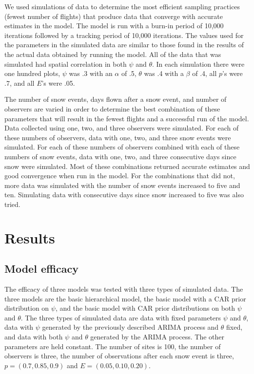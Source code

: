 \documentclass[11pt]{article}
\begin{document}
    We used simulations of data to determine the most efficient sampling
    practices (fewest number of flights) that produce data that converge with
    accurate estimates in the model.  The model is run with a burn-in period of
    10,000 iterations followed by a tracking period of 10,000 iterations.  The
    values used for the parameters in the simulated data are similar to those
    found in the results of the actual data obtained by running the model.  All
    of the data that was simulated had spatial correlation in both \(\psi\) and
    \(\theta\).  In each simulation there were one hundred plots, \(\psi\) was
    .3 with an \(\alpha\) of .5, \(\theta\) was .4 with a \(\beta\) of .4, all
    \(p\)'s were .7, and all \(E\)'s were .05.

    The number of snow events, days flown after a snow event, and number of
    observers are varied in order to determine the best combination of these
    parameters that will result in the fewest flights and a successful run of
    the model.  Data collected using one, two, and three observers were
    simulated.  For each of these numbers of observers, data with one, two, and
    three snow events were simulated.  For each of these numbers of observers
    combined with each of these numbers of snow events, data with one, two, and
    three consecutive days since snow were simulated.  Most of these
    combinations returned accurate estimates and good convergence when run in
    the model.  For the combinations that did not, more data was simulated with
    the number of snow events increased to five and ten.  Simulating data with
    consecutive days since snow increased to five was also tried.

\section{Results}

    \subsection{Model efficacy}

    The efficacy of three models was tested with three types of simulated data.
    The three models are the basic hierarchical model, the basic model with a
    CAR prior distribution on \(\psi\), and the basic model with CAR prior
    distributions on both \(\psi\) and \(\theta\).  The three types of
    simulated data are data with fixed parameters \(\psi\) and \(\theta\), data
    with \(\psi\) generated by the previously described ARIMA process and
    \(\theta\) fixed, and data with both \(\psi\) and \(\theta\) generated by
    the ARIMA process.  The other parameters are held constant.  The number of
    sites is 100, the number of observers is three, the number of observations
    after each snow event is three, \(p = (0.7, 0.85, 0.9)\) and \(E = (0.05,
    0.10, 0.20)\).
\end{document}
